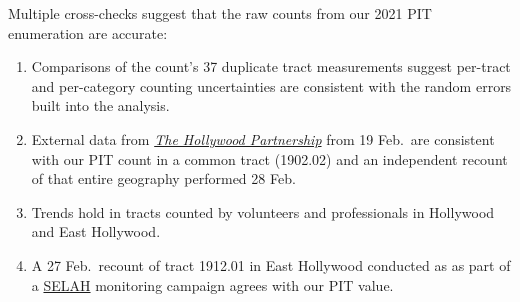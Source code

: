 \documentclass[11pt]{article}
\def\selah{SELAH}
\begin{document}
Multiple cross-checks suggest that the raw counts from our 2021 PIT enumeration are accurate:
\begin{enumerate}
	\item Comparisons of the count's 37 duplicate tract measurements suggest per-tract and per-category
		counting uncertainties are consistent with the random errors built into the analysis.
	\item External data from \href{https://hollywoodpartnership.com/}{\it The Hollywood Partnership} 
		from 19 Feb.\ are consistent with our PIT count in a common tract (1902.02) and an independent 
		recount of that entire geography performed 28 Feb.%
	\item Trends hold in tracts counted by volunteers and professionals in Hollywood and East Hollywood.
	\item A 27 Feb.\ recount of tract 1912.01 in East Hollywood conducted as as part of a
		\href{https://selahnch.org}{\selah} monitoring campaign agrees with our PIT value.%
\end{enumerate}
\end{document}
